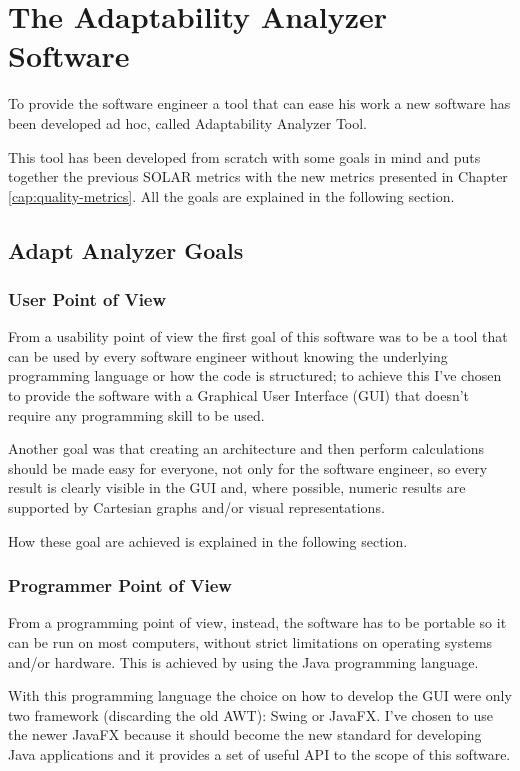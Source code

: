 \chapter{The Adaptability Analyzer Software}
\label{cap:design}

To provide the software engineer a tool that can ease his work a new software has been developed ad hoc, called Adaptability Analyzer Tool.

This tool has been developed from scratch with some goals in mind and puts together the previous SOLAR\cite{solar} metrics with the new metrics presented in Chapter \ref{cap:quality-metrics}. All the goals are explained in the following section.

\section{Adapt Analyzer Goals}
\subsection{User Point of View}
From a usability point of view the first goal of this software was to be a tool that can be used by every software engineer without knowing the underlying programming language or how the code is structured; to achieve this I've chosen to provide the software with a Graphical User Interface (GUI) that doesn't require any programming skill to be used.

Another goal was that creating an architecture and then perform calculations should be made easy for everyone, not only for the software engineer, so every result is clearly visible in the GUI and, where possible, numeric results are supported by Cartesian graphs and/or visual representations.

How these goal are achieved is explained in the following section.
\subsection{Programmer Point of View}
From a programming point of view, instead, the software has to be portable so it can be run on most computers, without strict limitations on operating systems and/or hardware. This is achieved by using the Java programming language\cite{java-se}. 

With this programming language the choice on how to develop the GUI were only two framework (discarding the old AWT\cite{awt}): Swing\cite{swing} or JavaFX\cite{javafx}. I've chosen to use the newer JavaFX because it should become the new standard for developing Java applications and it provides a set of useful API to the scope of this software.

